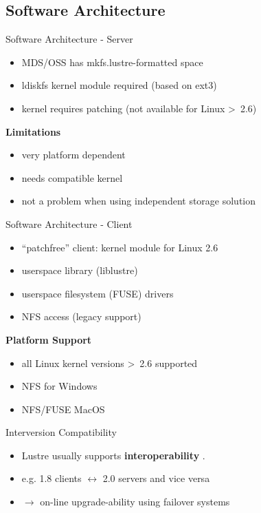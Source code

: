 \subsection{Software Architecture}

\begin{frame}{Software Architecture - Server}
    \begin{itemize}
        \item MDS/OSS has mkfs.lustre-formatted space
        \item ldiskfs kernel module required (based on ext3)
        \item kernel requires patching (not available for Linux \textgreater~2.6)
    \end{itemize}

    \textbf{Limitations}

    \begin{itemize}
        \item very platform dependent
        \item needs compatible kernel
        \item not a problem when using independent storage solution
    \end{itemize}
\end{frame}

\begin{frame}{Software Architecture - Client}
    \begin{itemize}
        \item ``patchfree'' client: kernel module for Linux 2.6
        \item userspace library (liblustre)
        \item userspace filesystem (FUSE) drivers
        \item NFS access (legacy support)
    \end{itemize}

    \textbf{Platform Support}
    \begin{itemize}
        \item all Linux kernel versions \textgreater~2.6 supported
        \item NFS for Windows
        \item NFS/FUSE MacOS
    \end{itemize}
\end{frame}

\begin{frame}{Interversion Compatibility}
    \begin{itemize}
        \item Lustre usually supports \textbf{interoperability} \cite{interoperability}.
        \item e.g. 1.8 clients $\leftrightarrow$ 2.0 servers and vice versa
        \item $\rightarrow$ on-line upgrade-ability using failover systems
    \end{itemize}
\end{frame}


